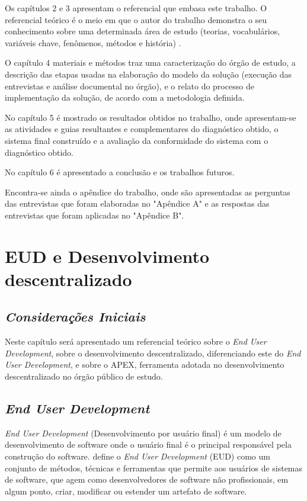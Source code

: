 Os capítulos 2 e 3 apresentam o referencial que embasa este trabalho. O referencial teórico é o meio em que o autor do trabalho demonstra o seu conhecimento sobre uma determinada área de estudo (teorias, vocabulários, variáveis chave, fenômenos, métodos e história) \cite{randolph2009}.

O capítulo 4 materiais e métodos traz uma caracterização do órgão de estudo, a descrição das etapas usadas na elaboração do modelo da solução (execução das entrevistas e análise documental no órgão), e o relato do processo de implementação da solução, de acordo com a metodologia definida.

No capítulo 5 é mostrado os resultados obtidos no trabalho, onde apresentam-se as atividades e guias resultantes e complementares do diagnóstico obtido, o sistema final construído e a avaliação da conformidade do sistema com o diagnóstico obtido.

No capítulo 6 é apresentado a conclusão e os trabalhos futuros.

Encontra-se ainda o apêndice do trabalho, onde são apresentadas as perguntas das entrevistas que foram elaboradas no "Apêndice A" e as respostas das entrevistas que foram aplicadas no "Apêndice B".

\chapter[EUD e Desenvolvimento descentralizado]{EUD e Desenvolvimento descentralizado}

\section{\textit{Considerações Iniciais}}

Neste capítulo será apresentado um referencial teórico sobre o \textit{End User Development}, sobre o desenvolvimento descentralizado, diferenciando este do \textit{End User Development}, e sobre o APEX, ferramenta adotada no desenvolvimento descentralizado no órgão público de estudo.

\section{\textit{End User Development}}

\textit{End User Development} (Desenvolvimento por usuário final) é um modelo de desenvolvimento de software onde o usuário final é o principal responsável pela construção do software.  define o \textit{End User Development} (EUD) como um conjunto de métodos, técnicas e ferramentas que permite aos usuários de sistemas de software, que agem como desenvolvedores de software não profissionais, em algum ponto, criar, modificar ou estender um artefato de software.

